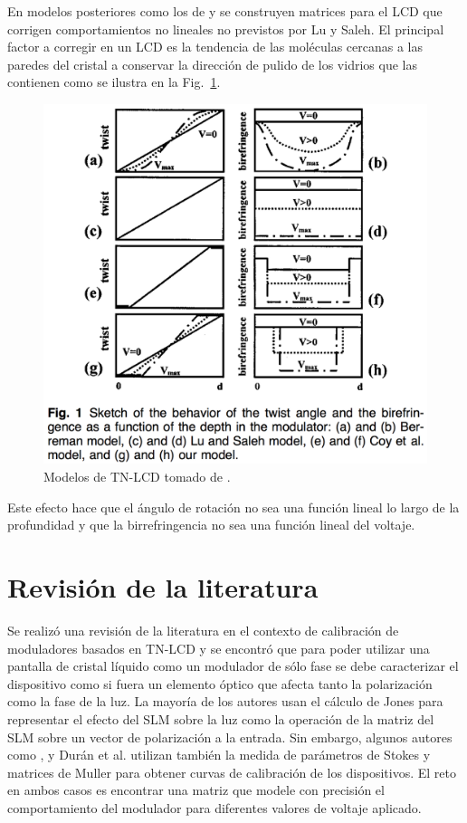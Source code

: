 En modelos posteriores como los de  y
 se construyen matrices para el LCD que
corrigen comportamientos no lineales no previstos por  Lu y Saleh. El
principal factor a corregir en un LCD es la tendencia de las moléculas
cercanas a las paredes del cristal a conservar la dirección de pulido
de los vidrios que las contienen como se ilustra en la Fig.~\ref{fig:lcd_models}.
\begin{figure}[h!]
\centering
\includegraphics[scale=.5]{lcd_models}
\caption[Modelos de TN-LCD]{Modelos de TN-LCD tomado de .}
\label{fig:lcd_models}
\end{figure}
 Este efecto hace que el ángulo de
rotación no sea una función lineal  lo largo de la profundidad y que la
birrefringencia no sea una función lineal del voltaje.

\section{Revisión de la literatura}
Se realizó una revisión de la literatura en el contexto de calibración
de moduladores basados en TN-LCD y se encontró que para poder utilizar
una pantalla de cristal líquido como un modulador de sólo fase se debe
caracterizar el dispositivo como si fuera un elemento óptico que
afecta tanto la polarización como la fase de la luz. La mayoría de los
autores usan el cálculo de Jones para representar el efecto del SLM
sobre la luz como la operación de la matriz del SLM sobre un vector de
polarización a la entrada. Sin embargo, algunos autores como ,  y Durán et al.  utilizan también
la medida de parámetros de  Stokes y matrices de Muller para obtener
curvas de calibración de los dispositivos. El reto en ambos casos es
encontrar una matriz que 
modele con precisión el comportamiento del modulador para diferentes
valores de voltaje aplicado. 

